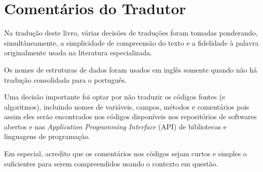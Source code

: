 \chapter*{Comentários do Tradutor}

Na tradução deste livro, várias decisões de traduções foram tomadas ponderando, simultâneamente,
a simplicidade de compreensão do texto e a fidelidade à palavra originalmente usada na literatura especializada.

Os nomes de estruturas de dados foram usados em inglês somente quando não há 
tradução consolidada para o português.

Uma decisão importante foi optar por não traduzir os códigos fontes 
(e algoritmos), incluindo nomes de variáveis, campos, métodos e comentários 
pois assim eles serão encontrados nos códigos disponíveis nos repositórios 
de softwares abertos e nas \emph{Application Programming Interface} (API) de 
bibliotecas e linguagens de programação. 

Em especial, acredito que os comentários nos códigos sejam curtos e simples o suficientes para serem
compreendidos usando o contexto em questão.
